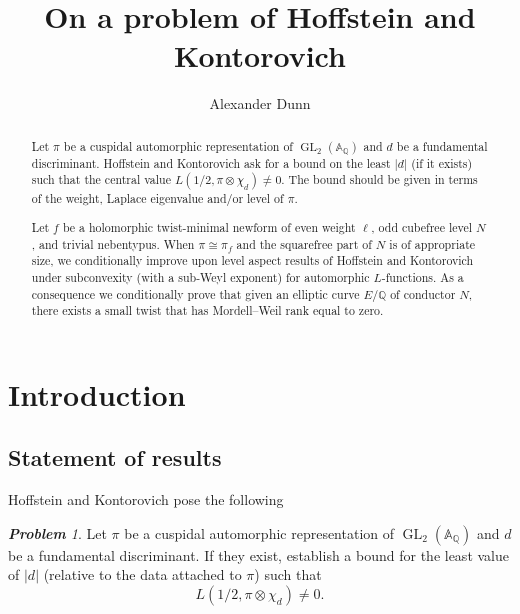 \documentclass[12pt,reqno]{amsart}
\theoremstyle{plain}
\theoremstyle{remark}
\newtheorem*{prob*}{\bf Problem}
\numberwithin{equation}{section}
\numberwithin{lemma}{section}
\numberwithin{theorem}{section}
\numberwithin{prop}{section}
\numberwithin{remark}{section}
\begin{document}
\author{Alexander Dunn}
\address{The Division of Physics, Mathematics and Astronomy, 
Caltech, 1200 E California Blvd, Pasadena, CA, 91125}

\title{On a problem of Hoffstein and Kontorovich}

\begin{abstract}
Let $\pi$ be a cuspidal automorphic representation of
$\operatorname{GL}_2(\mathbb{A}_{\mathbb{Q}})$
and $d$ be a fundamental discriminant.
Hoffstein and Kontorovich ask for a bound
on the least $|d|$ (if it exists)
such that the central value $L(1/2, \pi \otimes \chi_d)  \neq 0$.
The bound should be given in terms of the weight, Laplace eigenvalue 
and/or level of $\pi$.

Let $f$ be a holomorphic twist-minimal newform of even weight $\ell$, odd cubefree
level $N$, and trivial nebentypus. When $\pi \cong \pi_f$ and the squarefree part of
$N$ is of appropriate size,
we conditionally improve upon level aspect results of Hoffstein and 
Kontorovich under subconvexity (with a sub-Weyl exponent)
for automorphic $L$-functions.
As a consequence we conditionally prove that 
given an elliptic curve $E/\mathbb{Q}$ of conductor $N$,  
there exists a small twist that has Mordell--Weil rank equal to zero.
\end{abstract}

\maketitle

\section{Introduction}

\subsection{Statement of results}
Hoffstein and Kontorovich \cite{HK} pose the following
\begin{prob*} \label{mainq}
Let $\pi$ be a cuspidal automorphic representation
of $\operatorname{GL}_2(\mathbb{A}_{\mathbb{Q}})$
and $d$ be a fundamental discriminant.  
If they exist, establish a bound for the least value of $|d|$ 
(relative to the data attached to $\pi$)
such that 
\begin{equation} \label{nonvanish}
L(1/2, \pi \otimes \chi_d) \neq 0.
\end{equation}
\end{prob*}
\end{document}
